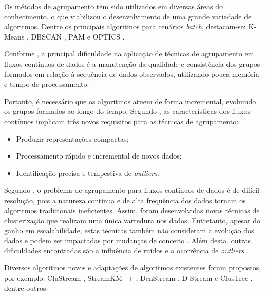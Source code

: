 \documentclass[qual, classic, a4paper]{ufbathesis}
\begin{document}
Os métodos de agrupamento têm sido utilizados em diversas áreas do conhecimento, o que viabilizou o desenvolvimento de uma grande variedade de algoritmos.
Dentre os principais algoritmos para cenários \textit{batch}, destacam-se:
K-Means \cite{Lloyd:2006:LSQ:2263356.2269955},
DBSCAN \cite{Ester:1996:DAD:3001460.3001507},
PAM \cite{kaufman:clustering1990} e 
OPTICS \cite{Ankerst:1999:OOP:304181.304187}.

Conforme \cite{Gama:2010:KDD:1855075}, a principal dificuldade na aplicação de técnicas de agrupamento em fluxos contínuos de dados é 
a manutenção da qualidade e consistência dos grupos formados em relação à sequência de dados observados, utilizando pouca memória e tempo de processamento. 

Portanto, é necessário que os algoritmos atuem de forma incremental, evoluindo os grupos formados ao longo do tempo.
Segundo \cite{Barbara:2002:RCD:507515.507519}, as características dos fluxos contínuos implicam três novos requisitos para as técnicas de agrupamento:

\begin{itemize}
    \item Produzir representações compactas;
    \item Processamento rápido e incremental de novos dados;
    \item Identificação precisa e tempestiva de \textit{outliers}.
\end{itemize}

Segundo \cite{Aggarwal:2003:FCE:1315451.1315460}, o problema de agrupamento para fluxos contínuos de dados é de difícil resolução,
pois a natureza contínua e de alta frequência dos dados tornam os algoritmos tradicionais ineficientes.
Assim, foram desenvolvidas novas técnicas de clusterização que realizam uma única varredura nos dados. 
Entretanto, apesar do ganho em escalabilidade, estas técnicas também não consideram a evolução dos dados e podem ser impactadas por mudanças de conceito \cite{Aggarwal:2003:FCE:1315451.1315460}.
Além desta, outras dificuldades encontradas são a influência de ruídos e a ocorrência de \textit{outliers} \cite{Khalilian:DBLP:journals/corr/abs-1006-5261}.

Diversos algoritmos novos e adaptações de algoritmos existentes foram propostos, por exemplo: 
CluStream \cite{Aggarwal:2003:FCE:1315451.1315460},
StreamKM++ \cite{Ackermann:2012:SCA:2133803.2184450},
DenStream \cite{Cao:Feng:Ester},
D-Stream \cite{Chen:Tu} e ClusTree \cite{Kranen:2011:CIM:2134350.2134352}, dentre outros.
\end{document}

